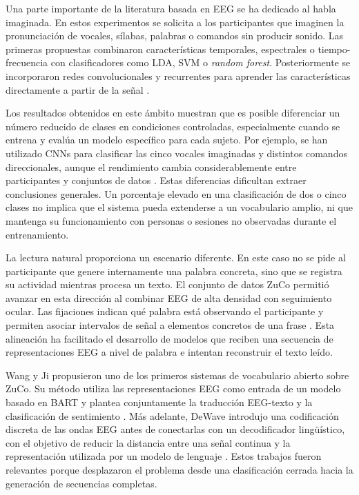 Una parte importante de la literatura basada en EEG se ha dedicado al habla imaginada. En estos experimentos se solicita a los participantes que imaginen la pronunciación de vocales, sílabas, palabras o comandos sin producir sonido. Las primeras propuestas combinaron características temporales, espectrales o tiempo-frecuencia con clasificadores como LDA, SVM o \textit{random forest}. Posteriormente se incorporaron redes convolucionales y recurrentes para aprender las características directamente a partir de la señal \cite{panachakel2021covert,alzahrani2024systematic}.

Los resultados obtenidos en este ámbito muestran que es posible diferenciar un número reducido de clases en condiciones controladas, especialmente cuando se entrena y evalúa un modelo específico para cada sujeto. Por ejemplo, se han utilizado CNNs para clasificar las cinco vocales imaginadas y distintos comandos direccionales, aunque el rendimiento cambia considerablemente entre participantes y conjuntos de datos \cite{tamm2020vowels,sarmiento2021vowels}. Estas diferencias dificultan extraer conclusiones generales. Un porcentaje elevado en una clasificación de dos o cinco clases no implica que el sistema pueda extenderse a un vocabulario amplio, ni que mantenga su funcionamiento con personas o sesiones no observadas durante el entrenamiento.

La lectura natural proporciona un escenario diferente. En este caso no se pide al participante que genere internamente una palabra concreta, sino que se registra su actividad mientras procesa un texto. El conjunto de datos ZuCo permitió avanzar en esta dirección al combinar EEG de alta densidad con seguimiento ocular. Las fijaciones indican qué palabra está observando el participante y permiten asociar intervalos de señal a elementos concretos de una frase \cite{hollenstein2020zuco2}. Esta alineación ha facilitado el desarrollo de modelos que reciben una secuencia de representaciones EEG a nivel de palabra e intentan reconstruir el texto leído.

Wang y Ji propusieron uno de los primeros sistemas de vocabulario abierto sobre ZuCo. Su método utiliza las representaciones EEG como entrada de un modelo basado en BART y plantea conjuntamente la traducción EEG-texto y la clasificación de sentimiento \cite{wang2022openvocab}. Más adelante, DeWave introdujo una codificación discreta de las ondas EEG antes de conectarlas con un decodificador lingüístico, con el objetivo de reducir la distancia entre una señal continua y la representación utilizada por un modelo de lenguaje \cite{duan2023dewave}. Estos trabajos fueron relevantes porque desplazaron el problema desde una clasificación cerrada hacia la generación de secuencias completas.

